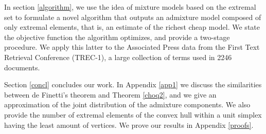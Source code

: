 \documentclass[12pt, reqno]{amsart}
\theoremstyle{definition}
\begin{document}
In section \ref{algorithm}, we use the idea of mixture models based on the extremal set to formulate a novel algorithm that outputs an admixture model composed of only extremal elements, that is, an estimate of the richest cheap model. We state the objective function the algorithm optimizes, and provide a two-stage procedure. We apply this latter to the Associated Press data from the First Text Retrieval Conference (TREC-1), a large collection of terms used in 2246 documents.

Section \ref{concl} concludes our work. In Appendix \ref{app1} we discuss the similarities between de Finetti's theorem and Theorem \ref{choq2}, and we give an approximation of the joint distribution of the admixture components. We also provide the number of extremal elements of the convex hull within a unit simplex having the least amount of vertices.
We prove our results in Appendix \ref{proofs}.

\end{document}
